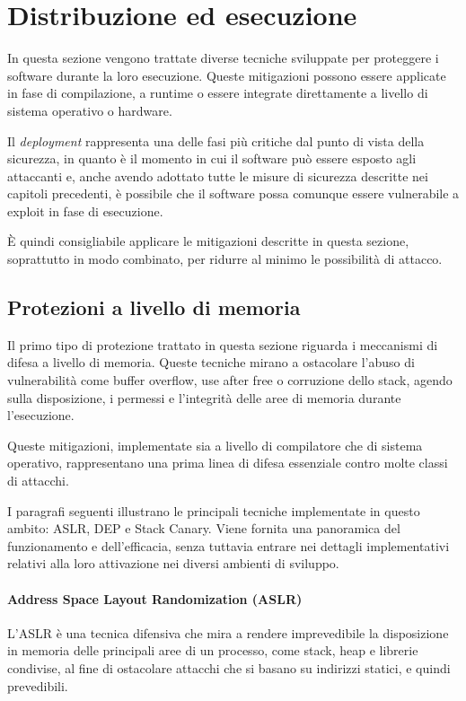 \section{Distribuzione ed esecuzione}
\label{sec:deployment}

In questa sezione vengono trattate diverse tecniche sviluppate per proteggere i software
durante la loro esecuzione. Queste mitigazioni possono essere applicate in fase
di compilazione, a runtime o essere integrate direttamente a livello di sistema operativo
o hardware.

Il \textit{deployment} rappresenta una delle fasi più critiche dal punto di
vista della sicurezza, in quanto è il momento in cui il software può essere esposto
agli attaccanti e, anche avendo adottato tutte le misure di sicurezza descritte
nei capitoli precedenti, è possibile che il software possa comunque essere vulnerabile
a exploit in fase di esecuzione.

È quindi consigliabile applicare le mitigazioni descritte in questa sezione,
soprattutto in modo combinato, per ridurre al minimo le possibilità di attacco.

\subsection{Protezioni a livello di memoria}
\label{sec:memory-protection}

Il primo tipo di protezione trattato in questa sezione riguarda i meccanismi di
difesa a livello di memoria. Queste tecniche mirano a ostacolare l'abuso di vulnerabilità
come buffer overflow, use after free o corruzione dello stack, agendo sulla disposizione,
i permessi e l'integrità delle aree di memoria durante l'esecuzione.

Queste mitigazioni, implementate sia a livello di compilatore che di sistema operativo,
rappresentano una prima linea di difesa essenziale contro molte classi di
attacchi.

I paragrafi seguenti illustrano le principali tecniche implementate in questo
ambito: ASLR, DEP e Stack Canary. Viene fornita una panoramica del funzionamento
e dell'efficacia, senza tuttavia entrare nei dettagli implementativi relativi
alla loro attivazione nei diversi ambienti di sviluppo.

\paragraph{Address Space Layout Randomization (ASLR)}
L'ASLR è una tecnica difensiva che mira a rendere imprevedibile la disposizione in
memoria delle principali aree di un processo, come stack, heap e librerie condivise,
al fine di ostacolare attacchi che si basano su indirizzi statici, e quindi prevedibili.

